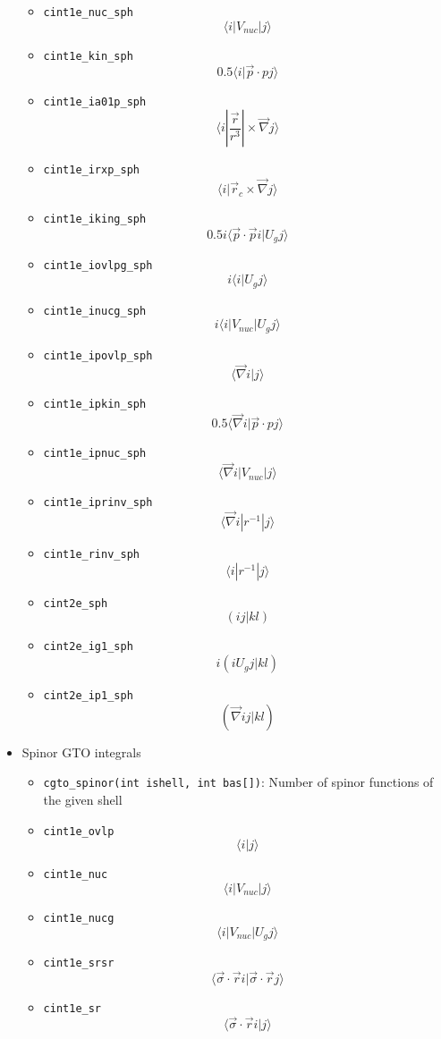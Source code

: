 \documentclass{article}
\begin{document}
\begin{itemize}
\begin{itemize}
  \item
    \verb!cint1e_nuc_sph! \[\langle  i| V_{nuc}| j\rangle \]
  \item
    \verb!cint1e_kin_sph! \[0.5\langle i| \vec{p} \cdot pj\rangle \]
  \item
    \verb!cint1e_ia01p_sph!
    \[\langle i| \frac{\vec{r}}{r^3}| \times \vec{\nabla} j\rangle \]
  \item
    \verb!cint1e_irxp_sph!
    \[\langle i| \vec{r}_c \times \vec{\nabla} j\rangle \]
  \item
    \verb!cint1e_iking_sph!
    \[0.5i\langle \vec{p} \cdot \vec{p} i| U_gj\rangle \]
  \item
    \verb!cint1e_iovlpg_sph! \[i\langle i| U_gj\rangle \]
  \item
    \verb!cint1e_inucg_sph! \[i\langle i| V_{nuc}| U_gj\rangle \]
  \item
    \verb!cint1e_ipovlp_sph! \[\langle \vec{\nabla} i|j\rangle \]
  \item
    \verb!cint1e_ipkin_sph!
    \[0.5\langle \vec{\nabla} i| \vec{p} \cdot pj\rangle \]
  \item
    \verb!cint1e_ipnuc_sph!
    \[\langle \vec{\nabla} i| V_{nuc}|j\rangle \]
  \item
    \verb!cint1e_iprinv_sph!
    \[\langle \vec{\nabla} i| r^{-1}|j\rangle \]
  \item
    \verb!cint1e_rinv_sph! \[\langle i| r^{-1} |j\rangle \]
  \item
    \verb!cint2e_sph! \[(ij|kl)\]
  \item
    \verb!cint2e_ig1_sph! \[i(i U_g j|kl)\]
  \item
    \verb!cint2e_ip1_sph! \[(\vec{\nabla} i j|kl)\]
  \end{itemize}
\item
  Spinor GTO integrals
  \begin{itemize}
  \item
    \verb!cgto_spinor(int ishell, int bas[])!: Number of spinor
    functions of the given shell
  \item
    \verb!cint1e_ovlp! \[\langle  i| j\rangle \]
  \item
    \verb!cint1e_nuc! \[\langle  i| V_{nuc} |j\rangle \]
  \item
    \verb!cint1e_nucg! \[\langle  i| V_{nuc} | U_gj\rangle \]
  \item
    \verb!cint1e_srsr!
    \[\langle \vec{\sigma}\cdot\vec{r} i| \vec{\sigma}\cdot\vec{r}j\rangle \]
  \item
    \verb!cint1e_sr! \[\langle \vec{\sigma}\cdot\vec{r} i|j\rangle \]

\end{itemize}
\end{itemize}
\end{document}
